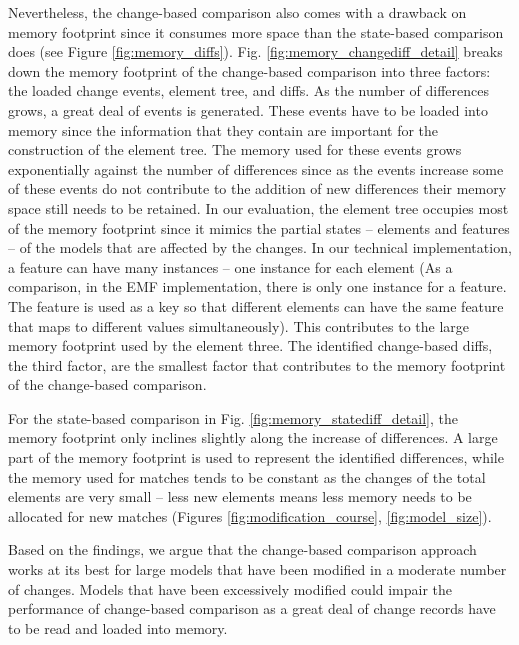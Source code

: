 \documentclass{llncs}
\begin{document}
Nevertheless, the change-based comparison also comes with a drawback on memory footprint since it consumes more space than the state-based comparison does (see Figure \ref{fig:memory_diffs}). Fig. \ref{fig:memory_changediff_detail} breaks down the memory footprint of the change-based comparison into three factors: the loaded change events, element tree, and diffs. As the number of differences grows, a great deal of events is generated. These events have to be loaded into memory since the information that they contain are important for the construction of the element tree. The memory used for these events grows exponentially against the number of differences since as the events increase some of these events do not contribute to the addition of new differences their memory space still needs to be retained. In our evaluation, the element tree occupies most of the memory footprint since it mimics the partial states -- elements and features -- of the models that are affected by the changes. In our technical implementation, a feature can have many instances -- one instance for each element (As a comparison, in the EMF implementation, there is only one instance for a feature. The feature is used as a key so that different elements can have the same feature that maps to different values simultaneously). This contributes to the large memory footprint used by the element three. The identified change-based diffs, the third factor, are the smallest factor that contributes to the memory footprint of the change-based comparison. 

For the state-based comparison in Fig. \ref{fig:memory_statediff_detail}, the memory footprint only inclines slightly along the increase of differences. A large part of the memory footprint is used to represent the identified differences, while the memory used for matches tends to be constant as the changes of the total elements are very small -- less new elements means less memory needs to be allocated for new matches (Figures \ref{fig:modification_course}, \ref{fig:model_size}). 

Based on the findings, we argue that the change-based comparison approach works at its best for large models that have been modified in a moderate number of changes. Models that have been excessively modified could impair the performance of change-based comparison as a great deal of change records have to be read and loaded into memory. 
\end{document}
